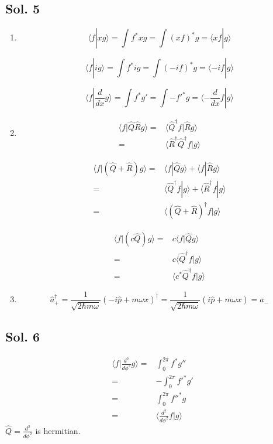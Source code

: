 \subsection*{Sol. 5}
\begin{enumerate}
    \item 
    $$
    \langle
    f|xg
    \rangle=\int f^*xg
    =\int (xf)^*g
    =
    \langle
    xf|g
    \rangle
    $$

    $$
    \langle
    f|ig
    \rangle=\int f^*ig
    =\int (-if)^*g
    =
    \langle
    -if|g
    \rangle
    $$

    $$
    \langle
    f|\frac{d}{dx}g
    \rangle=\int f^*g'
    =\int -f'^*g
    =
    \langle
    -\frac{d}{dx}f|g
    \rangle
    $$
    \item 
    \begin{align*}
        \langle f|\hat{Q}\hat{R}g\rangle
        =& 
        \langle \hat{Q}^\dagger f|\hat{R}g\rangle\\
        =& 
        \langle \hat{R}^\dagger\hat{Q}^\dagger f|g\rangle
    \end{align*}

    \begin{align*}
        \langle f|(\hat{Q}+\hat{R})g\rangle
        =& 
        \langle f|\hat{Q}g\rangle
        +
        \langle f|\hat{R}g\rangle\\
        =& 
        \langle \hat{Q}^\dagger f|g\rangle + 
        \langle \hat{R}^\dagger f|g\rangle\\
        =&
        \langle (\hat{Q}+\hat{R})^\dagger f|g\rangle
    \end{align*}

    \begin{align*}
        \langle f|(c\hat{Q})g\rangle
        =& 
        c\langle f|\hat{Q}g\rangle\\
        =& 
        c\langle \hat{Q}^\dagger f|g\rangle\\
        =&
        \langle c^*\hat{Q}^\dagger f|g\rangle
    \end{align*}
    \item 
    $$
    \hat{a}_+^\dagger = \frac{1}{\sqrt{2\hbar m\omega}}
    (-i\hat{p}+m\omega x)^\dagger 
    =
     \frac{1}{\sqrt{2\hbar m\omega}}
     (i\hat{p}+m\omega x)=\hat{a}_-
    $$
\end{enumerate}

\subsection*{Sol. 6}
\begin{align*}
    \langle f|\frac{d^2}{d\phi^2}g
    \rangle
    =& 
    \int_0^{2\pi}
    f^*g''\\
    =& - \int_0^{2\pi}f'^*g'\\
    =&\int_0^{2\pi}f''^*g\\
    =&\langle \frac{d^2}{d\phi^2}f|g\rangle
\end{align*}
$
\hat{Q}=\frac{d^2}{d\phi^2}
$
is hermitian.

